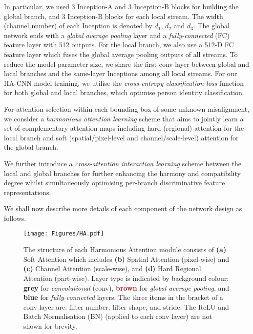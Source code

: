\documentclass[10pt,twocolumn,letterpaper]{article}
\begin{document}
In particular, we used 3 Inception-A and 3 Inception-B blocks for building the global branch, 
and 3 Inception-B blocks for each local stream.
The width (channel number) of each Inception is denoted by $d_1$, $d_2$ and $d_3$.
The global network ends with a \textit{global average pooling} layer and 
a \textit{fully-connected} (FC) feature layer with 512 outputs. 
For the local branch, we also use a 512-D FC feature layer 
which fuses the {global average pooling} outputs of all streams. 
To reduce the model parameter size, 
we share 
the first conv layer between global and local branches
and the same-layer Inceptions among all local streams.
For our HA-CNN model training, we utilise the {\em cross-entropy classification loss} function for both global and local branches, which optimise person identity classification.

For attention selection within each bounding box of some unknown misalignment,
we consider a {\em harmonious attention learning} scheme
that aims to jointly learn a set of complementary attention maps including
hard (regional) attention for the local branch and soft (spatial/pixel-level and channel/scale-level) attention
for the global branch.

We further introduce a {\em cross-attention interaction learning} scheme 
between the local and global branches
for further enhancing the harmony and compatibility degree
whilst
simultaneously optimising per-branch discriminative feature representations.

We shall now describe more details of each component of the network
design as follows.

\begin{figure} [!ht]
	\centering
	\texttt{[image: Figures/HA.pdf]}
	\vskip -0.3cm
	\caption{ The structure of each Harmonious Attention module consists of
		{\bf (a)} Soft Attention which includes 
		{\bf (b)} Spatial Attention (pixel-wise)
		and 
		{\bf (c)} Channel Attention (scale-wise),
		and 
		{\bf (d)} Hard Regional Attention (part-wise).
		Layer type is indicated by background colour:
		\textcolor{battleshipgrey}{\bf grey} for \textit{convolutional} (conv),  
		\textcolor{brown}{\bf brown} for \textit{global average pooling}, 
		and 
		\textcolor{capri}{\bf blue} for \textit{fully-connected} layers.
		The three items in the bracket of a conv layer are:  
		filter number, filter shape, and stride.
The ReLU \cite{krizhevsky2012imagenet} and Batch Normalisation (BN) \cite{ioffe2015batch} (applied to each conv layer) are not shown for brevity. 
	}
	\label{fig:attentions}
	\vspace{-0.5cm}
\end{figure}
\end{document}

